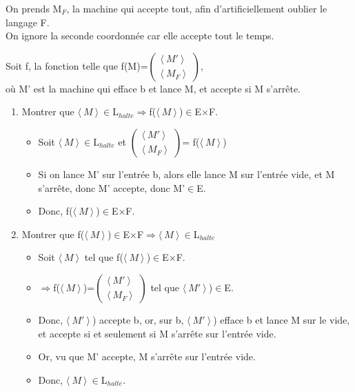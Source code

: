 On prends M$_F$, la machine qui accepte tout, afin d'artificiellement oublier le langage F.\\
On ignore la seconde coordonnée car elle accepte tout le temps.

Soit f, la fonction telle que f(M)=$\begin{pmatrix}\langle\ M'\ \rangle \!\ \\ \langle\ M_F\ \rangle \!\ \end{pmatrix}$,\\
où M' est la machine qui efface b et lance M, et accepte si M s'arrête.

\begin{enumerate}
  \item Montrer que $\langle\ M\ \rangle \!\ \in$L$_{halte}\Rightarrow$f($\langle\ M\ \rangle \!\ $)$\in$E$\times$F.
  \begin{itemize}
    \item Soit $\langle\ M\ \rangle \!\ \in$L$_{halte}$ et $\begin{pmatrix}\langle\ M'\ \rangle \!\ \\ \langle\ M_F\ \rangle \!\ \end{pmatrix}$=
    f($\langle\ M\ \rangle \!\ $)
    \item Si on lance M' sur l'entrée b, alors elle lance M sur l'entrée vide, et M s'arrête, donc M' accepte, donc M'$\in$E.
    \item Donc, f($\langle\ M\ \rangle \!\ $)$\in$E$\times$F.
  \end{itemize}
  \item Montrer que f($\langle\ M\ \rangle \!\ $)$\in$E$\times$F$\Rightarrow$$\langle\ M\ \rangle \!\ \in$L$_{halte}$
  \begin{itemize}
    \item Soit $\langle\ M\ \rangle \!\ $ tel que f($\langle\ M\ \rangle \!\ $)$\in$E$\times$F.
    \item $\Rightarrow$f($\langle\ M\ \rangle \!\ $)=$\begin{pmatrix}\langle\ M'\ \rangle \!\ \\ \langle\ M_F\ \rangle \!\ \end{pmatrix}$
    tel que $\langle\ M'\ \rangle \!\ $)$\in$E.
    \item Donc, $\langle\ M'\ \rangle \!\ $) accepte b, or, sur b, $\langle\ M'\ \rangle \!\ $) efface b et lance M sur le vide, et accepte si et seulement si
    M s'arrête sur l'entrée vide.
    \item Or, vu que M' accepte, M s'arrête sur l'entrée vide.
    \item Donc, $\langle\ M\ \rangle \!\ \in$L$_{halte}$.
  \end{itemize}
\end{enumerate}

